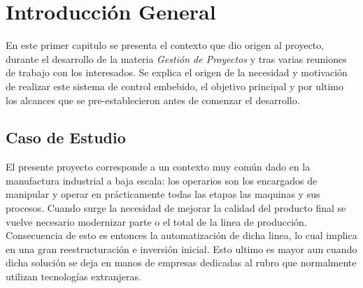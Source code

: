 
\newcommand{\keyword}[1]{\textbf{#1}}
\newcommand{\tabhead}[1]{\textbf{#1}}
\newcommand{\code}[1]{\texttt{#1}}
\newcommand{\file}[1]{\texttt{\bfseries#1}}
\newcommand{\option}[1]{\texttt{\itshape#1}}
\newcommand{\grados}{$^{\circ}$}


\chapter{ Introducción General } %

\label{Chapter1} %
\label{IntroGeneral}
En este primer capitulo se presenta el contexto que dio origen al proyecto, durante el desarrollo de la materia \emph{Gestión de Proyectos} y tras varias reuniones de trabajo con los interesados. Se explica el origen de la necesidad y motivación de realizar este sistema de control embebido, el objetivo principal y por ultimo los alcances que se pre-establecieron antes de comenzar el desarrollo. 

\section{ Caso de Estudio }

El presente proyecto corresponde a un contexto muy común dado en la manufactura industrial a baja escala: los operarios son los encargados de manipular y operar en prácticamente todas las etapas las maquinas y sus procesos. 
Cuando surge la necesidad de mejorar la calidad del producto final se vuelve necesario modernizar parte o el total de la linea de producción. Consecuencia de esto es entonces la automatización de dicha linea, lo cual implica en una gran reestructuración e inversión inicial. Esto ultimo es mayor aun cuando dicha solución se deja en manos de empresas dedicadas al rubro que normalmente utilizan tecnologías extranjeras.

